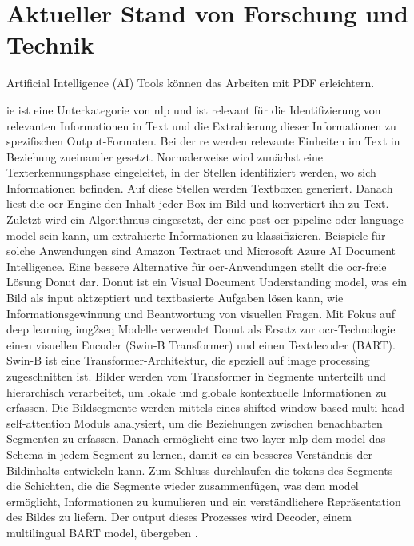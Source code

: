 \section{Aktueller Stand von Forschung und Technik}
Artificial Intelligence (AI) Tools können das Arbeiten mit PDF erleichtern. 

\gls{ie} ist eine Unterkategorie von \gls{nlp} und ist relevant für die Identifizierung von relevanten Informationen in Text und die Extrahierung dieser Informationen zu spezifischen Output-Formaten. Bei der \gls{re} werden relevante Einheiten im Text in Beziehung zueinander gesetzt. Normalerweise wird zunächst eine Texterkennungsphase eingeleitet, in der Stellen identifiziert werden, wo sich Informationen befinden. Auf diese Stellen werden Textboxen generiert. Danach liest die \gls{ocr}-Engine den Inhalt jeder Box im Bild und konvertiert ihn zu Text. Zuletzt wird ein Algorithmus eingesetzt, der eine post-\gls{ocr} pipeline oder language model sein kann, um extrahierte Informationen zu klassifizieren. Beispiele für solche Anwendungen sind Amazon Textract und Microsoft Azure AI Document Intelligence. Eine bessere Alternative für \gls{ocr}-Anwendungen stellt die \gls{ocr}-freie Lösung Donut dar. Donut ist ein Visual Document Understanding model, was ein Bild als input aktzeptiert und textbasierte Aufgaben lösen kann, wie Informationsgewinnung und Beantwortung von visuellen Fragen. Mit Fokus auf deep learning img2seq Modelle verwendet Donut als Ersatz zur \gls{ocr}-Technologie einen visuellen Encoder (Swin-B Transformer) und einen Textdecoder (BART). Swin-B ist eine Transformer-Architektur, die speziell auf image processing zugeschnitten ist. Bilder werden vom Transformer in Segmente unterteilt und hierarchisch verarbeitet, um lokale und globale kontextuelle Informationen zu erfassen. Die Bildsegmente werden mittels eines shifted window-based multi-head self-attention Moduls analysiert, um die Beziehungen zwischen benachbarten Segmenten zu erfassen. Danach ermöglicht eine two-layer \gls{mlp} dem model das Schema in jedem Segment zu lernen, damit es ein besseres Verständnis der Bildinhalts entwickeln kann. Zum Schluss durchlaufen die tokens des Segments die Schichten, die die Segmente wieder zusammenfügen, was dem model ermöglicht, Informationen zu kumulieren und ein verständlichere Repräsentation des Bildes zu liefern. Der output dieses Prozesses wird Decoder, einem multilingual BART model, übergeben \cite{transformers-ocr}. \\


